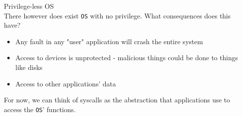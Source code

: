 \documentclass[journal, letterpaper]{IEEEtran}
\begin{document}
\begin{aside}{Privilege-less OS} \\ 
    There however does exist \verb|OS| with no privilege. What consequences does this have?
    \begin{itemize}
        \item Any fault in any "user" application will crash the entire system
        \item Access to devices is unprotected - malicious things could be done to things like disks
        \item Access to other applications' data
    \end{itemize}
\end{aside}

For now, we can think of syscalls as the abstraction that applications use to access the \verb|OS|' functions.
\end{document}
